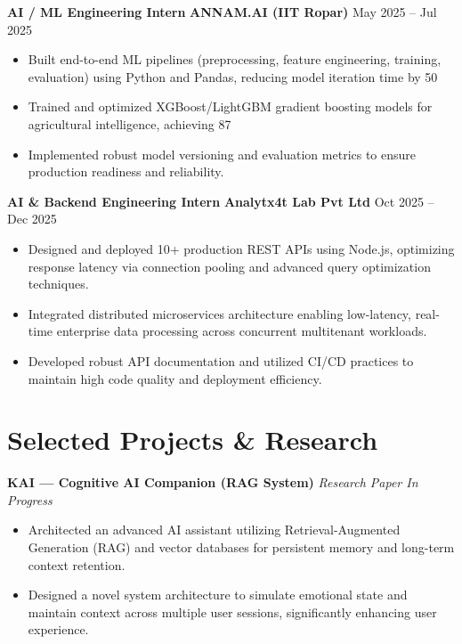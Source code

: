 \documentclass[10pt, a4paper]{article}
\begin{document}
\textbf{AI / ML Engineering Intern} \hfill \textbf{ANNAM.AI (IIT Ropar)} \hfill May 2025 – Jul 2025
\begin{itemize}[label=$\bullet$, itemsep=2pt]
    \item Built end-to-end ML pipelines (preprocessing, feature engineering, training, evaluation) using Python and Pandas, reducing model iteration time by 50%
    \item Trained and optimized XGBoost/LightGBM gradient boosting models for agricultural intelligence, achieving 87%
    \item Implemented robust model versioning and evaluation metrics to ensure production readiness and reliability.
\end{itemize}

\vspace{4pt}

\textbf{AI & Backend Engineering Intern} \hfill \textbf{Analytx4t Lab Pvt Ltd} \hfill Oct 2025 – Dec 2025
\begin{itemize}[label=$\bullet$, itemsep=2pt]
    \item Designed and deployed 10+ production REST APIs using Node.js, optimizing response latency via connection pooling and advanced query optimization techniques.
    \item Integrated distributed microservices architecture enabling low-latency, real-time enterprise data processing across concurrent multitenant workloads.
    \item Developed robust API documentation and utilized CI/CD practices to maintain high code quality and deployment efficiency.
\end{itemize}

\section*{Selected Projects \& Research}

\textbf{KAI — Cognitive AI Companion (RAG System)} \hfill \textit{Research Paper In Progress}
\begin{itemize}[label=$\circ$, itemsep=1pt]
    \item Architected an advanced AI assistant utilizing Retrieval-Augmented Generation (RAG) and vector databases for persistent memory and long-term context retention.
    \item Designed a novel system architecture to simulate emotional state and maintain context across multiple user sessions, significantly enhancing user experience.
\end{itemize}
\end{document}
